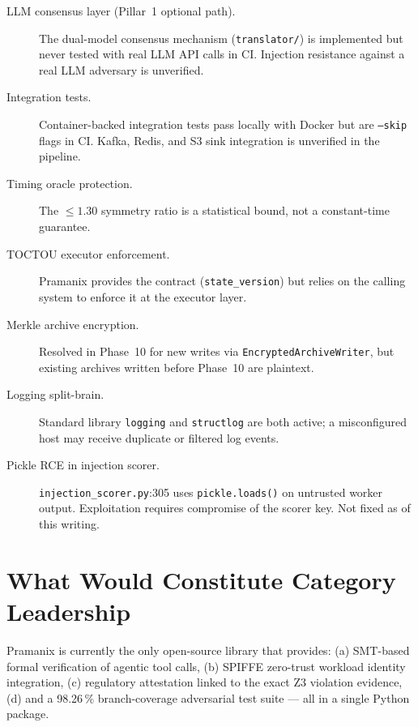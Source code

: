 \documentclass[12pt,a4paper,oneside]{report}
\newcommand{\fname}[1]{\texttt{#1}}          %
\newcommand{\code}[1]{\texttt{#1}}           %
\begin{document}
\begin{description}
  \item[LLM consensus layer (Pillar~1 optional path).] The dual-model
    consensus mechanism (\fname{translator/}) is implemented but never tested
    with real LLM API calls in CI.  Injection resistance against a real LLM
    adversary is unverified.

  \item[Integration tests.] Container-backed integration tests pass locally
    with Docker but are \code{--skip} flags in CI.  Kafka, Redis,
    and S3 sink integration is unverified in the pipeline.

  \item[Timing oracle protection.] The $\leq 1.30$ symmetry ratio is a
    statistical bound, not a constant-time guarantee.

  \item[TOCTOU executor enforcement.] Pramanix provides the contract
    (\code{state\_version}) but relies on the calling system to enforce it at
    the executor layer.

  \item[Merkle archive encryption.] Resolved in Phase~10 for new writes
    via \code{EncryptedArchiveWriter}, but existing archives written before
    Phase~10 are plaintext.

  \item[Logging split-brain.] Standard library \code{logging} and
    \code{structlog} are both active; a misconfigured host may receive
    duplicate or filtered log events.

  \item[Pickle RCE in injection scorer.] \fname{injection\_scorer.py}:305 uses
    \code{pickle.loads()} on untrusted worker output.  Exploitation requires
    compromise of the scorer key.  Not fixed as of this writing.
\end{description}

\section{What Would Constitute Category Leadership}

Pramanix is currently the only open-source library that provides:
(a) SMT-based formal verification of agentic tool calls,
(b) SPIFFE zero-trust workload identity integration,
(c) regulatory attestation linked to the exact Z3 violation evidence,
(d) and a 98.26\,\% branch-coverage adversarial test suite --- all in a
single Python package.
\end{document}
